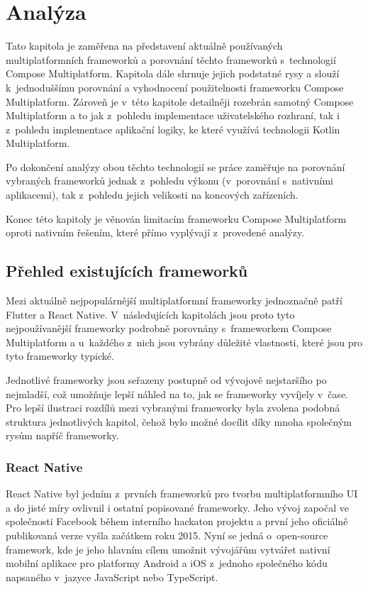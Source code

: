 \chapter{Analýza}
Tato kapitola je zaměřena na představení aktuálně používaných multiplatformních frameworků a porovnání těchto frameworků
s~technologií Compose Multiplatform. Kapitola dále shrnuje jejich podstatné rysy a slouží
k~jednoduššímu porovnání a vyhodnocení použitelnosti frameworku Compose Multiplatform. Zároveň je v~této kapitole detailněji
rozebrán samotný Compose Multiplatform a to jak z~pohledu implementace uživatelského rozhraní, tak i z~pohledu implementace
aplikační logiky, ke které využívá technologii Kotlin Multiplatform.

Po dokončení analýzy obou těchto technologií se práce zaměřuje na porovnání vybraných frameworků jednak z~pohledu výkonu 
(v~porovnání s~nativními aplikacemi), tak z~pohledu jejich velikosti na koncových zařízeních.

Konec této kapitoly je věnován limitacím frameworku Compose Multiplatform oproti nativním řešením, které přímo vyplývají 
z~provedené analýzy.


\section{Přehled existujících frameworků}
Mezi aktuálně nejpopulárnější multiplatformní frameworky jednoznačně patří Flutter a React Native. \cite{crossPlatformFrameworksStats}
V~následujících kapitolách jsou proto tyto nejpoužívanější frameworky podrobně porovnány s~frameworkem Compose Multiplatform a u~každého z~nich 
jsou vybrány důležité vlastnosti, které jsou pro tyto frameworky typické. 

Jednotlivé frameworky jsou seřazeny postupně od vývojově nejstaršího
po nejmladší, což umožňuje lepší náhled na to, jak se frameworky vyvíjely v~čase. Pro lepší ilustraci rozdílů 
mezi vybranými frameworky byla zvolena 
podobná struktura jednotlivých kapitol, čehož bylo možné docílit díky mnoha společným rysům napříč frameworky.

\subsection{React Native}
React Native byl jedním z~prvních frameworků pro tvorbu multiplatformního UI a do jisté míry ovlivnil i ostatní popisované
frameworky. Jeho vývoj započal ve společnosti Facebook během interního hackaton projektu a první jeho oficiálně publikovaná
verze vyšla začátkem roku 2015. \cite{reactNativeHistory}
Nyní se jedná o~open-source framework, kde je jeho hlavním cílem umožnit vývojářům vytvářet nativní mobilní aplikace 
pro platformy Android a iOS z~jednoho společného kódu napsaného v~jazyce JavaScript nebo TypeScript.

